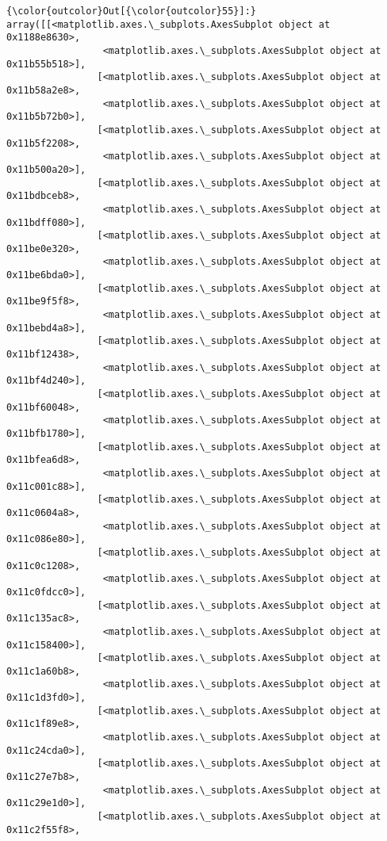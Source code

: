 \documentclass[11pt]{article}
\begin{document}
\begin{Verbatim}[commandchars=\\\{\}]
{\color{outcolor}Out[{\color{outcolor}55}]:} array([[<matplotlib.axes.\_subplots.AxesSubplot object at 0x1188e8630>,
                 <matplotlib.axes.\_subplots.AxesSubplot object at 0x11b55b518>],
                [<matplotlib.axes.\_subplots.AxesSubplot object at 0x11b58a2e8>,
                 <matplotlib.axes.\_subplots.AxesSubplot object at 0x11b5b72b0>],
                [<matplotlib.axes.\_subplots.AxesSubplot object at 0x11b5f2208>,
                 <matplotlib.axes.\_subplots.AxesSubplot object at 0x11b500a20>],
                [<matplotlib.axes.\_subplots.AxesSubplot object at 0x11bdbceb8>,
                 <matplotlib.axes.\_subplots.AxesSubplot object at 0x11bdff080>],
                [<matplotlib.axes.\_subplots.AxesSubplot object at 0x11be0e320>,
                 <matplotlib.axes.\_subplots.AxesSubplot object at 0x11be6bda0>],
                [<matplotlib.axes.\_subplots.AxesSubplot object at 0x11be9f5f8>,
                 <matplotlib.axes.\_subplots.AxesSubplot object at 0x11bebd4a8>],
                [<matplotlib.axes.\_subplots.AxesSubplot object at 0x11bf12438>,
                 <matplotlib.axes.\_subplots.AxesSubplot object at 0x11bf4d240>],
                [<matplotlib.axes.\_subplots.AxesSubplot object at 0x11bf60048>,
                 <matplotlib.axes.\_subplots.AxesSubplot object at 0x11bfb1780>],
                [<matplotlib.axes.\_subplots.AxesSubplot object at 0x11bfea6d8>,
                 <matplotlib.axes.\_subplots.AxesSubplot object at 0x11c001c88>],
                [<matplotlib.axes.\_subplots.AxesSubplot object at 0x11c0604a8>,
                 <matplotlib.axes.\_subplots.AxesSubplot object at 0x11c086e80>],
                [<matplotlib.axes.\_subplots.AxesSubplot object at 0x11c0c1208>,
                 <matplotlib.axes.\_subplots.AxesSubplot object at 0x11c0fdcc0>],
                [<matplotlib.axes.\_subplots.AxesSubplot object at 0x11c135ac8>,
                 <matplotlib.axes.\_subplots.AxesSubplot object at 0x11c158400>],
                [<matplotlib.axes.\_subplots.AxesSubplot object at 0x11c1a60b8>,
                 <matplotlib.axes.\_subplots.AxesSubplot object at 0x11c1d3fd0>],
                [<matplotlib.axes.\_subplots.AxesSubplot object at 0x11c1f89e8>,
                 <matplotlib.axes.\_subplots.AxesSubplot object at 0x11c24cda0>],
                [<matplotlib.axes.\_subplots.AxesSubplot object at 0x11c27e7b8>,
                 <matplotlib.axes.\_subplots.AxesSubplot object at 0x11c29e1d0>],
                [<matplotlib.axes.\_subplots.AxesSubplot object at 0x11c2f55f8>,

\end{Verbatim}
\end{document}

